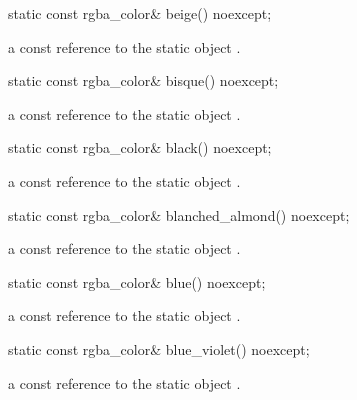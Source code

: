 \begin{itemdecl}
static const rgba_color& beige() noexcept;
\end{itemdecl}
\begin{itemdescr}
\pnum
\returns
a const reference to the static  object .
\end{itemdescr}

\begin{itemdecl}
static const rgba_color& bisque() noexcept;
\end{itemdecl}
\begin{itemdescr}
\pnum
\returns
a const reference to the static  object .
\end{itemdescr}

\begin{itemdecl}
static const rgba_color& black() noexcept;
\end{itemdecl}
\begin{itemdescr}
\pnum
\returns
a const reference to the static  object .
\end{itemdescr}

\begin{itemdecl}
static const rgba_color& blanched_almond() noexcept;
\end{itemdecl}
\begin{itemdescr}
\pnum
\returns
a const reference to the static  object .
\end{itemdescr}

\begin{itemdecl}
static const rgba_color& blue() noexcept;
\end{itemdecl}
\begin{itemdescr}
\pnum
\returns
a const reference to the static  object .
\end{itemdescr}

\begin{itemdecl}
static const rgba_color& blue_violet() noexcept;
\end{itemdecl}
\begin{itemdescr}
\pnum
\returns
a const reference to the static  object .
\end{itemdescr}

